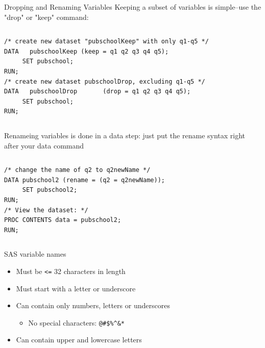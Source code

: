 \documentclass[table,smaller]{beamer}
\begin{document}
\begin{frame}[fragile,label=sec-4-5]{Dropping and Renaming Variables}
 Keeping a subset  of variables is simple--use the "drop" or "keep" command:

\vspace{-.75em} \begin{columns}  \begin{block}{}
\begin{verbatim}
/* create new dataset "pubschoolKeep" with only q1-q5 */
DATA   pubschoolKeep (keep = q1 q2 q3 q4 q5);
     SET pubschool;
RUN;
/* create new dataset pubschoolDrop, excluding q1-q5 */
DATA   pubschoolDrop       (drop = q1 q2 q3 q4 q5);
     SET pubschool;
RUN;
\end{verbatim}
\end{block} \end{columns} \vspace{.25em}


Renameing variables is done in a data step: just put the rename syntax right after your data command

\vspace{-.75em} \begin{columns}  \begin{block}{}
\begin{verbatim}
/* change the name of q2 to q2newName */
DATA pubschool2 (rename = (q2 = q2newName));
     SET pubschool2;
RUN;
/* View the dataset: */
PROC CONTENTS data = pubschool2;
RUN;
\end{verbatim}
\end{block} \end{columns} \vspace{.25em}
\end{frame}
\begin{frame}[fragile,label=sec-4-6]{SAS variable names}
 \begin{itemize}
\item Must be \verb~<=~ 32 characters in length
\item Must start with a letter or underscore
\item Can contain only numbers, letters or underscores
\begin{itemize}
\item No special characters: \verb~@#$%^&*~
\end{itemize}
\item Can contain upper and lowercase letters
\end{itemize}
\end{frame}
\end{document}
